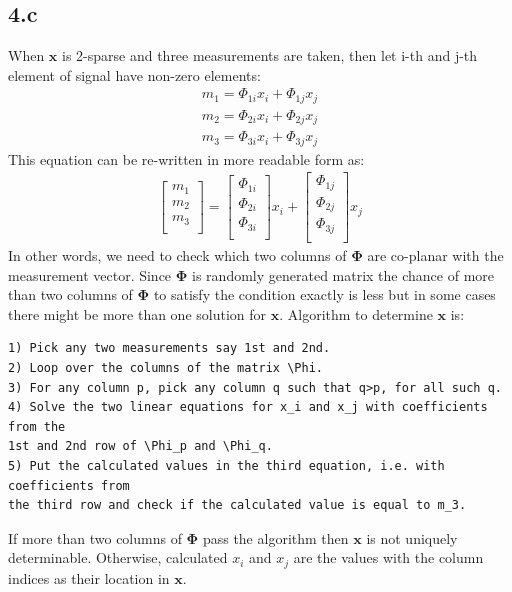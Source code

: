 \documentclass[12pt]{article}
\begin{document}
\subsection*{4.c}
When $\boldsymbol{x}$ is 2-sparse and three measurements are taken, then let i-th and j-th element of signal have non-zero elements:
\begin{align*}
    m_1 = \Phi_{1i}x_i+\Phi_{1j}x_j\\
    m_2 = \Phi_{2i}x_i+\Phi_{2j}x_j\\
    m_3 = \Phi_{3i}x_i+\Phi_{3j}x_j
\end{align*}
This equation can be re-written in more readable form as:
\begin{align*}
    \begin{bmatrix} 
    m_1 \\
    m_2 \\
    m_3 \\
    \end{bmatrix} =
    \begin{bmatrix} 
    \Phi_{1i} \\
    \Phi_{2i} \\
    \Phi_{3i} \\
    \end{bmatrix}x_i +
    \begin{bmatrix} 
    \Phi_{1j} \\
    \Phi_{2j} \\
    \Phi_{3j} \\
    \end{bmatrix}x_j
\end{align*}
In other words, we need to check which two columns of $\boldsymbol{\Phi}$ are co-planar with the measurement vector. Since $\boldsymbol{\Phi}$ is randomly generated matrix the chance of more than two columns of $\boldsymbol{\Phi}$ to satisfy the condition exactly is less but in some cases there might be more than one solution for $\boldsymbol{x}$. Algorithm to determine $\boldsymbol{x}$ is:
\begin{verbatim}
1) Pick any two measurements say 1st and 2nd.
2) Loop over the columns of the matrix \Phi.
3) For any column p, pick any column q such that q>p, for all such q.
4) Solve the two linear equations for x_i and x_j with coefficients from the 
1st and 2nd row of \Phi_p and \Phi_q.
5) Put the calculated values in the third equation, i.e. with coefficients from 
the third row and check if the calculated value is equal to m_3.
\end{verbatim}
If more than two columns of $\boldsymbol{\Phi}$ pass the algorithm then $\boldsymbol{x}$ is not uniquely determinable. Otherwise, calculated $x_i$ and $x_j$ are the values with the column indices as their location in $\boldsymbol{x}$.
\end{document}
